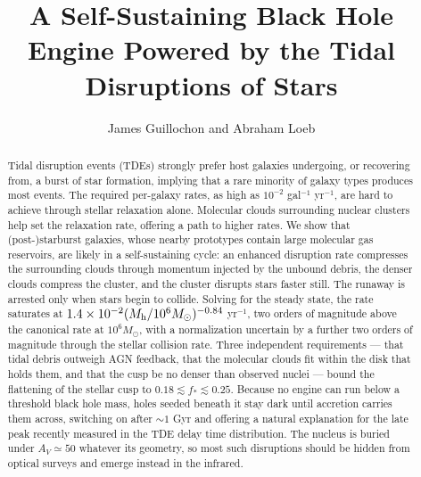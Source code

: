 \documentclass[preprint2]{aastex}
\begin{document}


\title{A Self-Sustaining Black Hole Engine Powered by the Tidal Disruptions of Stars}

\author{James Guillochon and Abraham Loeb}


\begin{abstract}
Tidal disruption events (TDEs) strongly prefer host galaxies undergoing, or recovering from, a burst of star formation, implying that a rare minority of galaxy types produces most events. The required per-galaxy rates, as high as $10^{-2}$ gal$^{-1}$ yr$^{-1}$, are hard to achieve through stellar relaxation alone. Molecular clouds surrounding nuclear clusters help set the relaxation rate, offering a path to higher rates. We show that (post-)starburst galaxies, whose nearby prototypes contain large molecular gas reservoirs, are likely in a self-sustaining cycle: an enhanced disruption rate compresses the surrounding clouds through momentum injected by the unbound debris, the denser clouds compress the cluster, and the cluster disrupts stars faster still. The runaway is arrested only when stars begin to collide. Solving for the steady state, the rate saturates at $1.4\times10^{-2}(M_{\rm h}/10^{6}M_\odot)^{-0.84}$ yr$^{-1}$, two orders of magnitude above the canonical rate at $10^{6}M_\odot$, with a normalization uncertain by a further two orders of magnitude through the stellar collision rate. Three independent requirements --- that tidal debris outweigh AGN feedback, that the molecular clouds fit within the disk that holds them, and that the cusp be no denser than observed nuclei --- bound the flattening of the stellar cusp to $0.18 \lesssim f_\ast \lesssim 0.25$. Because no engine can run below a threshold black hole mass, holes seeded beneath it stay dark until accretion carries them across, switching on after $\sim 1$ Gyr and offering a natural explanation for the late peak recently measured in the TDE delay time distribution. The nucleus is buried under $A_V \simeq 50$ whatever its geometry, so most such disruptions should be hidden from optical surveys and emerge instead in the infrared.
\end{abstract}
\end{document}
